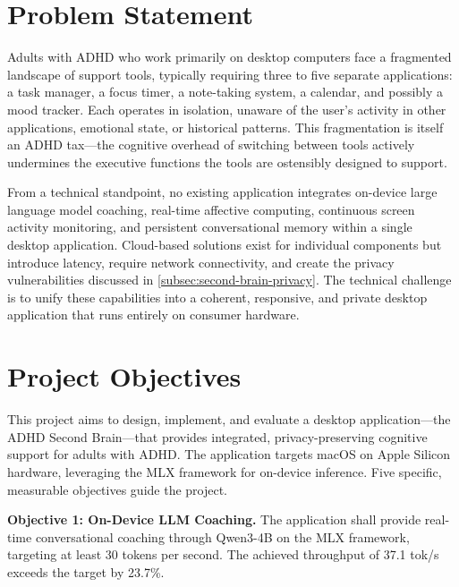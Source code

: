 \section{Problem Statement}
\label{sec:problem-statement}

Adults with ADHD who work primarily on desktop computers face a fragmented landscape of support tools, typically requiring three to five separate applications: a task manager, a focus timer, a note-taking system, a calendar, and possibly a mood tracker. Each operates in isolation, unaware of the user's activity in other applications, emotional state, or historical patterns. This fragmentation is itself an ADHD tax---the cognitive overhead of switching between tools actively undermines the executive functions the tools are ostensibly designed to support.

From a technical standpoint, no existing application integrates on-device large language model coaching, real-time affective computing, continuous screen activity monitoring, and persistent conversational memory within a single desktop application. Cloud-based solutions exist for individual components but introduce latency, require network connectivity, and create the privacy vulnerabilities discussed in \cref{subsec:second-brain-privacy}. The technical challenge is to unify these capabilities into a coherent, responsive, and private desktop application that runs entirely on consumer hardware.

\section{Project Objectives}
\label{sec:objectives}

This project aims to design, implement, and evaluate a desktop application---the ADHD Second Brain---that provides integrated, privacy-preserving cognitive support for adults with ADHD. The application targets macOS on Apple Silicon hardware, leveraging the MLX framework for on-device inference. Five specific, measurable objectives guide the project.

\textbf{Objective 1: On-Device LLM Coaching.} The application shall provide real-time conversational coaching through Qwen3-4B on the MLX framework, targeting at least 30 tokens per second. The achieved throughput of 37.1 tok/s exceeds the target by 23.7\%.

